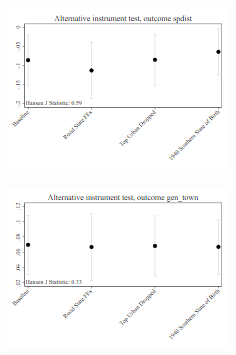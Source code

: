 \documentclass{article}
\begin{document}
\clearpage
\begin{figure}
	\centering
	\includegraphics[width=.8\textwidth]{figures/exogeneity_tests/D16_alt_inst_pooled_spdist_urban.png}
\end{figure}
\clearpage
\clearpage
\begin{figure}
	\centering
	\includegraphics[width=.8\textwidth]{figures/exogeneity_tests/D16_alt_inst_pooled_gen_town_urban.png}
\end{figure}
\clearpage
\end{document}
